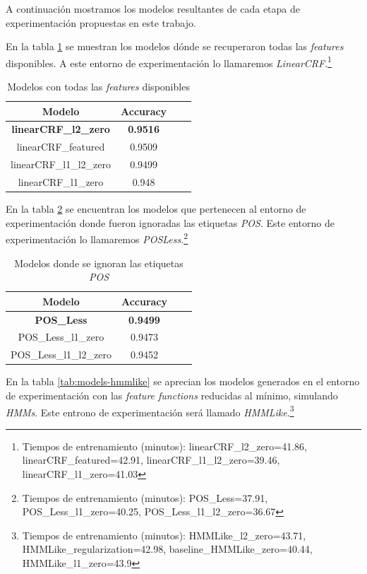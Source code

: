 \documentclass[letterpaper,12pt,oneside]{book}
\theoremstyle{definition}
\begin{document}
A continuación mostramos los modelos resultantes de cada etapa de experimentación propuestas en este trabajo.

En la tabla \ref{tab:models-full-featured} se muestran los modelos dónde se recuperaron todas las \textit{features} disponibles. A este entorno de experimentación lo llamaremos \textit{LinearCRF}.\footnote{Tiempos de entrenamiento (minutos): linearCRF\_l2\_zero=41.86, linearCRF\_featured=42.91, linearCRF\_l1\_l2\_zero=39.46, linearCRF\_l1\_zero=41.03}

\begin{table}[ht]
    \centering
    \begin{tabular}{| c | c | c | c |}\hline
    \textbf{Modelo} & \textbf{Accuracy}\\\hline
    \textbf{\textsf{linearCRF\_l2\_zero}} & \textbf{0.9516}\\
    \textsf{linearCRF\_featured} & 0.9509\\
    \textsf{linearCRF\_l1\_l2\_zero} & 0.9499\\
    \textsf{linearCRF\_l1\_zero} & 0.948\\\hline
    \end{tabular}
    \caption{Modelos con todas las \textit{features} disponibles}
    \label{tab:models-full-featured}
\end{table}

En la tabla \ref{tab:models-pos-less} se encuentran los modelos que pertenecen al entorno de experimentación donde fueron ignoradas las etiquetas \textit{POS}. Este entorno de experimentación lo llamaremos \textit{POSLess}.\footnote{Tiempos de entrenamiento (minutos): POS\_Less=37.91, POS\_Less\_l1\_zero=40.25, POS\_Less\_l1\_l2\_zero=36.67}

\begin{table}[ht]
    \centering
    \begin{tabular}{| c | c | c | c |}\hline
    \textbf{Modelo} & \textbf{Accuracy}\\\hline
    \textbf{\textsf{POS\_Less}} & \textbf{0.9499}\\
    \textsf{POS\_Less\_l1\_zero} & 0.9473\\
    \textsf{POS\_Less\_l1\_l2\_zero} & 0.9452\\\hline
    \end{tabular}
    \caption{Modelos donde se ignoran las etiquetas \textit{POS}}
    \label{tab:models-pos-less}
\end{table}

En la tabla \ref{tab:models-hmmlike} se aprecian los modelos generados en el entorno de experimentación con las \textit{feature functions} reducidas al mínimo, simulando \textit{HMMs}. Este entrono de experimentación será llamado \textit{HMMLike}.\footnote{Tiempos de entrenamiento (minutos): HMMLike\_l2\_zero=43.71, HMMLike\_regularization=42.98, baseline\_HMMLike\_zero=40.44, HMMLike\_l1\_zero=43.9 }
\end{document}
